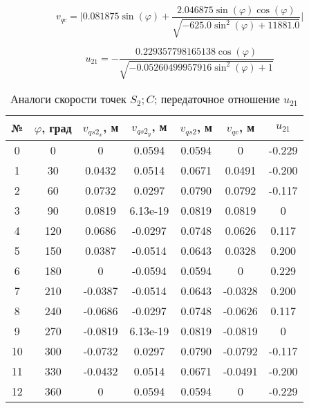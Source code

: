 \begin{equation}
	v_{qc} = \Big | 0.081875 \sin{\left (\varphi \right )} + \frac{2.046875 \sin{\left (\varphi \right )} \cos{\left (\varphi \right )}}{\sqrt{- 625.0 \sin^{2}{\left (\varphi \right )} + 11881.0}} \Big |
\end{equation}

\begin{equation}
	u_{21} = - \frac{0.229357798165138 \cos{\left (\varphi \right )}}{\sqrt{- 0.05260499957916 \sin^{2}{\left (\varphi \right )} + 1}}
\end{equation}

\begin{table}
\caption{Аналоги скорости точек $S_2; C$; передаточное отношение $u_{21}$}
\begin{tabular}{|c|c|c|c|c|c|c|}
	\hline 
	№& $\varphi$, град & $v_{qs2_x}$, м & $v_{qs2_y}$, м & $v_{qs2}$, м & $v_{qc}$, м & $u_{21}$ \\ 
	\hline 
	0  &    0 &        0 &    0.0594 &  0.0594 &        0 &  -0.229 \\
	\hline 
	1  &   30 &   0.0432 &    0.0514 &  0.0671 &   0.0491 &  -0.200 \\
	\hline 
	2  &   60 &   0.0732 &    0.0297 &  0.0790 &   0.0792 &  -0.117 \\
	\hline 
	3  &   90 &   0.0819 &  6.13e-19 &  0.0819 &   0.0819 &       0 \\
	\hline 
	4  &  120 &   0.0686 &   -0.0297 &  0.0748 &   0.0626 &   0.117 \\
	\hline 
	5  &  150 &   0.0387 &   -0.0514 &  0.0643 &   0.0328 &   0.200 \\
	\hline 
	6  &  180 &        0 &   -0.0594 &  0.0594 &        0 &   0.229 \\
	\hline 
	7  &  210 &  -0.0387 &   -0.0514 &  0.0643 &  -0.0328 &   0.200 \\
	\hline 
	8  &  240 &  -0.0686 &   -0.0297 &  0.0748 &  -0.0626 &   0.117 \\
	\hline 
	9  &  270 &  -0.0819 &  6.13e-19 &  0.0819 &  -0.0819 &       0 \\
	\hline 
	10 &  300 &  -0.0732 &    0.0297 &  0.0790 &  -0.0792 &  -0.117 \\
	\hline 
	11 &  330 &  -0.0432 &    0.0514 &  0.0671 &  -0.0491 &  -0.200 \\
	\hline 
	12 &  360 &        0 &    0.0594 &  0.0594 &        0 &  -0.229 \\
	\hline
\end{tabular} 
\end{table}


